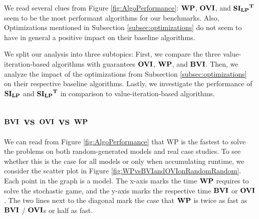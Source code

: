 
We read several clues from Figure \ref{fig:AlgoPerformance}: 
$\mathbf{WP}$, $\mathbf{OVI}$, and $\mathbf{\mathbf{SI_{LP}}^T}$ seem to be the most performant algorithms for our benchmarks. 
Also, Optimizations mentioned in Subsection \ref{subsec:optimizations} do not seem to have in general a positive impact on their baseline algorithms.

We split our analysis into three subtopics: 
First, we compare the three value-iteration-based algorithms with guarantees $\mathbf{OVI}$, $\mathbf{WP}$, and $\mathbf{BVI}$. 
Then, we analyze the impact of the optimizations from Subsection \ref{subsec:optimizations} on their respective baseline algorithms.
Lastly, we investigate the performance of $\mathbf{SI_{LP}}$ and $\mathbf{\mathbf{SI_{LP}}^T}$ in comparison to value-iteration-based algorithms.


\subsection{$\mathbf{BVI}$ vs $\mathbf{OVI}$ vs $\mathbf{WP}$}
We can read from Figure \ref{fig:AlgoPerformance} that WP is the fastest to solve the problems on both random-generated models and real case studies.
To see whether this is the case for all models or only when accumulating runtime, we consider the scatter plot in Figure \ref{fig:WPvsBVIandOVIonRandomRandom}.
Each point in the graph is a model. The x-axis marks the time $\mathbf{WP}$ requires to solve the stochastic game, and the y-axis marks the respective time $\mathbf{BVI}$ or $\mathbf{OVI}$.
The two lines next to the diagonal mark the case that $\mathbf{WP}$ is twice as fast as $\mathbf{BVI}$ / $\mathbf{OVI}$s or half as fast.

